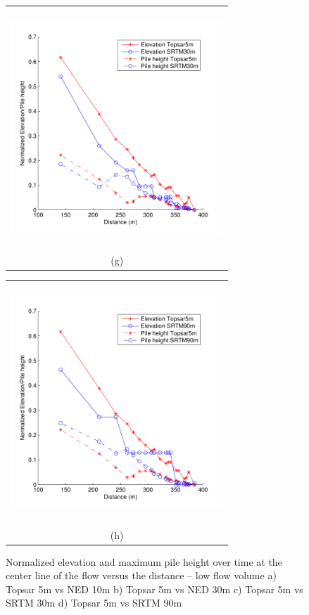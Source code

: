 \documentclass[12pt,letterpaper]{article}
\begin{document}
\begin{figure}[H]
\begin{minipage}[b]{0.5\textwidth}
    \begin{tabular}{c}
      \includegraphics[width=8cm,height=9cm,keepaspectratio]{plots/low_T5_S30.pdf}\\
      (g)
    \end{tabular}
  \end{minipage}
  \begin{minipage}{0.5\textwidth}
    \begin{tabular}{c}
      \includegraphics[width=8cm,height=9cm,keepaspectratio]{plots/low_T5_S90.pdf}\\
      (h)
    \end{tabular}
  \end{minipage}
   \caption{Normalized elevation and maximum pile height over time at the center line of the flow versus the distance -- low flow volume a) Topsar 5m vs NED 10m b) Topsar 5m vs NED 30m c) Topsar 5m vs SRTM 30m d) Topsar 5m vs SRTM 90m }\label{fig11}
\end{figure}
\end{document}
